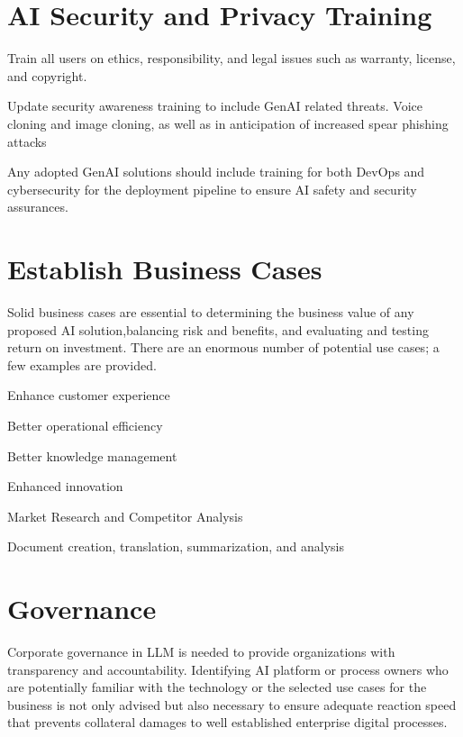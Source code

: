 \section{AI Security and Privacy Training}

\begin{minipage}{\linewidth}
\begin{checklist}
  \item Train all users on ethics, responsibility, and legal issues such as warranty, license, and copyright.
  \item Update security awareness training to include GenAI related threats. Voice cloning and image cloning, as well as in anticipation of increased spear phishing attacks
  \item Any adopted GenAI solutions should include training for both DevOps and cybersecurity for the deployment pipeline to ensure AI safety and security assurances.
\end{checklist}
\end{minipage}

\section{Establish Business Cases}
Solid business cases are essential to determining the business value of any
proposed AI solution,balancing risk and benefits, and evaluating and testing
return on investment. There are an enormous number of potential use cases; a
few examples are provided.

\begin{minipage}{\linewidth}
\begin{checklist}
  \item Enhance customer experience
  \item Better operational efficiency
  \item Better knowledge management
  \item Enhanced innovation
  \item Market Research and Competitor Analysis
  \item Document creation, translation, summarization, and analysis
\end{checklist}
\end{minipage}

\section{Governance}
Corporate governance in LLM is needed to provide organizations with transparency
and accountability. Identifying AI platform or process owners who are
potentially familiar with the technology or the selected use cases for the
business is not only advised but also necessary to ensure adequate reaction
speed that prevents collateral damages to well established enterprise digital
processes.


